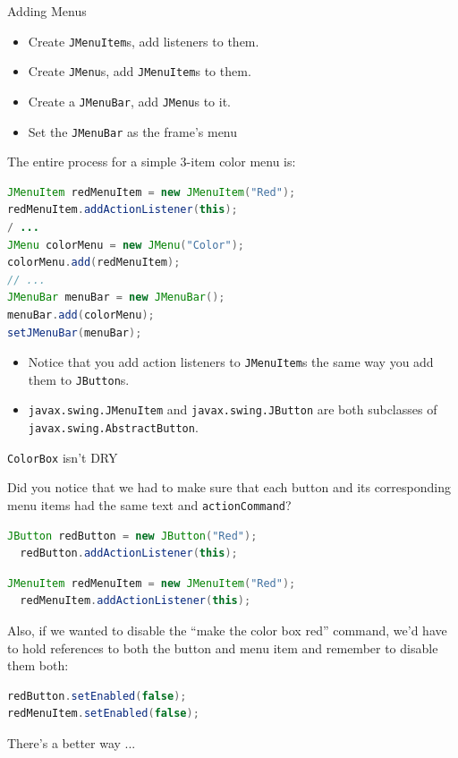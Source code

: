 \documentclass{beamer}
\begin{document}
\begin{frame}[fragile]{Adding Menus}

\vspace{-.05in}
\begin{itemize}
\item Create {\tt JMenuItem}s, add listeners to them.
\item Create {\tt JMenu}s, add {\tt JMenuItem}s to them.
\item Create a {\tt JMenuBar}, add {\tt JMenu}s to it.
\item Set the {\tt JMenuBar} as the frame's menu
\end{itemize}
The entire process for a simple 3-item color menu is:
\vspace{-.05in}
\begin{lstlisting}[language=Java]
JMenuItem redMenuItem = new JMenuItem("Red");
redMenuItem.addActionListener(this);
/ ...
JMenu colorMenu = new JMenu("Color");
colorMenu.add(redMenuItem);
// ...
JMenuBar menuBar = new JMenuBar();
menuBar.add(colorMenu);
setJMenuBar(menuBar);
\end{lstlisting}
\vspace{-.1in}
\begin{itemize}
\item Notice that you add action listeners to {\tt JMenuItem}s the same way you add them to {\tt JButton}s.
\item {\tt javax.swing.JMenuItem} and {\tt javax.swing.JButton} are both subclasses of {\tt javax.swing.AbstractButton}.
\end{itemize}
\end{frame}

\begin{frame}[fragile]{{\tt ColorBox} isn't DRY}

Did you notice that we had to make sure that each button and its corresponding menu items had the same text and {\tt actionCommand}?
\begin{lstlisting}[language=Java]
  JButton redButton = new JButton("Red");
  redButton.addActionListener(this);
\end{lstlisting}

\begin{lstlisting}[language=Java]
  JMenuItem redMenuItem = new JMenuItem("Red");
  redMenuItem.addActionListener(this);
\end{lstlisting}

Also, if we wanted to disable the ``make the color box red'' command, we'd have to hold references to both the button and menu item and remember to disable them both:
\begin{lstlisting}[language=Java]
redButton.setEnabled(false);
redMenuItem.setEnabled(false);
\end{lstlisting}
There's a better way ...

\end{frame}
\end{document}
